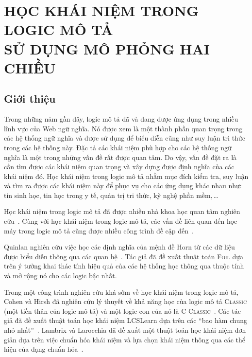 \chapter[Học khái niệm trong logic mô tả sử dụng mô phỏng hai~chiều]{HỌC KHÁI NIỆM TRONG LOGIC MÔ TẢ\\SỬ DỤNG MÔ PHỎNG HAI CHIỀU} 
\label{Chapter3}
\thispagestyle{fancy}

\section{Giới thiệu}
\label{sec:Chap3.Introduction}
Trong những năm gần đây, logic mô tả đã và đang được ứng dụng trong nhiều lĩnh vực của Web ngữ nghĩa. Nó được xem là một thành phần quan trọng trong các hệ thống ngữ nghĩa và được sử dụng để biểu diễn cũng như suy luận tri thức trong các hệ thống này. Đặc tả các khái niệm phù hợp cho các hệ thống ngữ nghĩa là một trong những vấn đề rất được quan tâm. Do vậy, vấn đề đặt ra là cần tìm được các khái niệm quan trọng và xây dựng được định nghĩa của các khái niệm đó. Học khái niệm trong logic mô tả nhằm mục đích kiểm tra, suy luận và tìm ra được các khái niệm này để phục vụ cho các ứng dụng khác nhau như: tin sinh học, tin học trong y tế, quản trị tri thức, kỹ nghệ phần mềm,\,\ldots

Học khái niệm trong logic mô tả đã được nhiều nhà khoa học quan tâm nghiên cứu~\cite{Quinlan1990,Cohen1994,Lambrix1998,Badea2000,Iannone2007,Fanizzi2004,Fanizzi2008,Lehmann2007,Fanizzi2010,Lehmann2010,Nguyen2013}. Cùng với học khái niệm trong logic mô tả, các vấn đề liên quan đến học máy trong logic mô tả cũng được nhiều công trình đề cập đến~\cite{Alvarez2000,Kietz2003,Revoredo2010,Konstantopoulos2010,Distel2011,Lisi2012,Lisi2012B,Lisi2013,Ma2013}.

Quinlan nghiên cứu việc học các định nghĩa của mệnh đề Horn từ các dữ liệu được biểu diễn thông qua các quan hệ~\cite{Quinlan1990}. Tác giả đã đề xuất thuật toán \textsc{Foil} dựa trên ý tưởng khai thác tính hiệu quả của các hệ thống học thông qua thuộc tính và mở rộng nó cho các logic bậc nhất.

Trong một công trình nghiên cứu khá sớm về học khái niệm trong logic mô tả, Cohen và Hirsh đã nghiên cứu lý thuyết về khả năng học của logic mô tả \textsc{Classic} (một tiền thân của logic mô tả) và một logic con của nó là \textsc{C-Classic}~\cite{Cohen1994}. Các tác giả đã đề xuất thuật toán học khái niệm LCSLearn dựa trên các ``bao hàm chung nhỏ nhất''~\cite{Cohen1992}. 
%
Lambrix và Larocchia đã đề xuất một thuật toán học khái niệm đơn giản dựa trên việc chuẩn hóa khái niệm và lựa chọn khái niệm thông qua các thể hiện của dạng chuẩn hóa~\cite{Lambrix1998}. 


